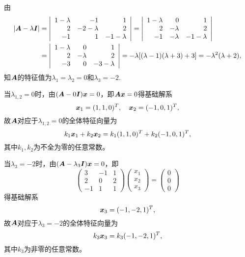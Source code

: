 \begin{frame}

\begin{jie}
  由
  $$
  \begin{aligned}
    |\boldsymbol{A}-\lambda\boldsymbol{I}|&=\left|
      \begin{array}{rrr}
        1-\lambda&-1&1\\
        2&-2-\lambda&2\\
        -1&1&-1-\lambda
      \end{array}
  \right|=\left|
    \begin{array}{rrr}
      1-\lambda&0&1\\
        2&-\lambda&2\\
        -1&-\lambda&-1-\lambda
    \end{array}
  \right|\\
  &=\left|
    \begin{array}{rrr}
      1-\lambda&0&1\\
      2&-\lambda&2\\
      -3&0&-3-\lambda
    \end{array}
  \right|=-\lambda[(\lambda-1)(\lambda+3)+3]=-\lambda^2(\lambda+2),
\end{aligned}
$$
知$\boldsymbol{A}$的特征值为$\lambda_1=\lambda_2=0$和$\lambda_3=-2$.

当$\lambda_{1,2}=0$时，由$(\boldsymbol{A}-0\boldsymbol{I}){\boldsymbol{x}}=0$，即$\boldsymbol{A}{\boldsymbol{x}}=0$得基础解系
$$
{\boldsymbol{x}}_1=(1,1,0)^T, \quad {\boldsymbol{x}}_2=(-1,0,1)^T,
$$
故$\boldsymbol{A}$对应于$\lambda_{1,2}=0$的全体特征向量为
$$
k_1{\boldsymbol{x}}_1+k_2{\boldsymbol{x}}_2=k_1(1,1,0)^T+k_2(-1,0,1)^T,
$$
其中$k_1,k_2$为不全为零的任意常数。


当$\lambda_{3}=-2$时，由$(\boldsymbol{A}-\lambda_{3}\boldsymbol{I}){\boldsymbol{x}}=0$，即
$$
\left(
  \begin{array}{rrr}
    3&-1&1\\
    2&0&2\\
    -1&1&1
  \end{array}
\right)\left(
  \begin{array}{c}
    x_1\\x_2\\x_3
  \end{array}
\right)=\left(
  \begin{array}{c}
    0\\0\\0
  \end{array}
\right)
$$得基础解系
$$
{\boldsymbol{x}}_3=(-1,-2,1)^T,
$$
故$\boldsymbol{A}$对应于$\lambda_{3}=-2$的全体特征向量为
$$
k_3{\boldsymbol{x}}_3=k_3(-1,-2,1)^T,
$$
其中$k_3$为非零的任意常数。



\end{jie}
\end{frame}
